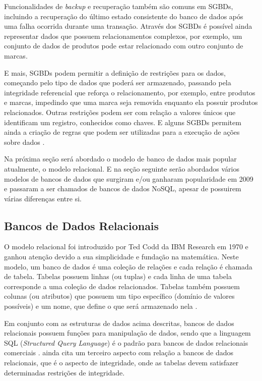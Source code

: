 \documentclass[diss]{template/setrem}
\begin{document}
Funcionalidades de \emph{backup} e recuperação também são comuns em SGBDs, incluindo a recuperação do último estado consistente do banco de dados após uma falha ocorrida durante uma transação. Através dos SGBDs é possível ainda representar dados que possuem relacionamentos complexos, por exemplo, um conjunto de dados de produtos pode estar relacionado com outro conjunto de marcas.

E mais, SGBDs podem permitir a definição de restrições para os dados, começando pelo tipo de dados que poderá ser armazenado, passando pela integridade referencial que reforça o relacionamento, por exemplo, entre produtos e marcas, impedindo que uma marca seja removida enquanto ela possuir produtos relacionados. Outras restrições podem ser com relação a valores únicos que identificam um registro, conhecidos como chaves. E alguns SGBDs permitem ainda a criação de regras que podem ser utilizadas para a execução de ações sobre dados \citep{Elmasri2011}.

Na próxima seção será abordado o modelo de banco de dados mais popular atualmente, o modelo relacional. E na seção seguinte serão abordados vários modelos de bancos de dados que surgiram e/ou ganharam popularidade em 2009 e passaram a ser chamados de bancos de dados NoSQL, apesar de possuirem várias diferenças entre si.

\subsection{Bancos de Dados Relacionais}
O modelo relacional foi introduzido por Ted Codd da IBM Research em 1970 e ganhou atenção devido a sua simplicidade e fundação na matemática. Neste modelo, um banco de dados é uma coleção de relações e cada relação é chamada de tabela. Tabelas possuem linhas (ou tuplas) e cada linha de uma tabela corresponde a uma coleção de dados relacionados. Tabelas também possuem colunas (ou atributos) que possuem um tipo específico (domínio de valores possíveis) e um nome, que define o que será armazenado nela \citep{Elmasri2011}.

Em conjunto com as estruturas de dados acima descritas, bancos de dados relacionais possuem funções para manipulação de dados, sendo que a linguagem SQL (\emph{Structured Query Language}) é o padrão para bancos de dados relacionais comerciais \citep{Elmasri2011}. \citet{Date2004} ainda cita um terceiro aspecto com relação a bancos de dados relacionais, que é o aspecto de integridade, onde as tabelas devem satisfazer determinadas restrições de integridade.
\end{document}
